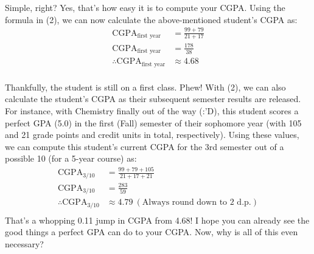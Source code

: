 \documentclass[letter]{article}
\begin{document}
Simple, right? Yes, that's how easy it is to compute your CGPA. Using the formula in (2), we can now calculate the above-mentioned student's CGPA as:
\begin{align*}
	\text{CGPA}_{\text{first year}}            & = \frac{99+79}{21+17} \\
	\text{CGPA}_{\text{first year}}            & = \frac{178}{38}      \\
	\therefore \text{CGPA}_{\text{first year}} & \approx 4.68          \\
\end{align*}

Thankfully, the student is still on a first class. Phew! With (2), we can also calculate the student's CGPA as their subsequent semester results are released. For instance, with Chemistry finally out of the way (:'D), this student scores a perfect GPA (5.0) in the first (Fall) semester of their sophomore year (with 105 and 21 grade points and credit units in total, respectively). Using these values, we can compute this student's current CGPA for the 3rd semester out of a possible 10 (for a 5-year course) as:
\begin{align*}
	\text{CGPA}_{\text{3/10}}            & = \frac{99+79+105}{21+17+21}                        \\
	\text{CGPA}_{\text{3/10}}            & = \frac{283}{59}                                    \\
	\therefore \text{CGPA}_{\text{3/10}} & \approx 4.79 \ (\text{Always round down to 2 d.p.}) \\
\end{align*}
That's a whopping 0.11 jump in CGPA from 4.68! I hope you can already see the good things a perfect GPA can do to your CGPA. Now, why is all of this even necessary?
\end{document}
